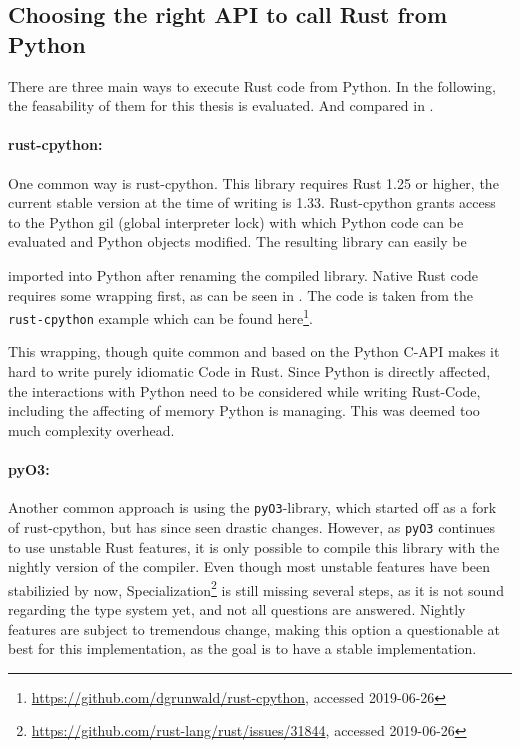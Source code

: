 \subsection{Choosing the right API to call Rust from Python}\label{sec:api}

There are three main ways to execute Rust code from Python. In the following,
the feasability of them for this thesis is evaluated. And compared in
.

\begin{stretchpars}
\paragraph{rust-cpython:} One common way is rust-cpython. This library requires
Rust 1.25 or higher, the current stable version at the time of writing is 1.33.
Rust-cpython grants access to the Python gil (global interpreter lock) with
which Python code can be evaluated and Python objects modified. The resulting
library can easily be
\end{stretchpars}


imported into Python after renaming the compiled library. Native Rust code
requires some wrapping first, as can be seen in . The code is
taken from the \verb|rust-cpython| example which can be found
here\footnote{\url{https://github.com/dgrunwald/rust-cpython}, accessed
2019-06-26}. 

This wrapping, though quite common and based on the Python C-API makes
it hard to write purely idiomatic Code in Rust. Since Python is directly
affected, the interactions with Python need to be considered while writing
Rust-Code, including the affecting of memory Python is managing. This was
deemed too much complexity overhead.


\paragraph{pyO3:} Another common approach is using the \verb|pyO3|-library, which
started off as a fork of rust-cpython, but has since seen drastic changes.
However, as \verb|pyO3| continues to use unstable Rust features, it is only
possible to compile this library with the nightly version of the compiler. Even
though most unstable features have been stabilizied by now,
Specialization\footnote{\url{https://github.com/rust-lang/rust/issues/31844},
accessed 2019-06-26} is still missing several steps, as it is not sound
regarding the type system yet, and not all questions are answered. Nightly
features are subject to tremendous change, making this option a questionable at
best for this implementation, as the goal is to have a stable implementation.


